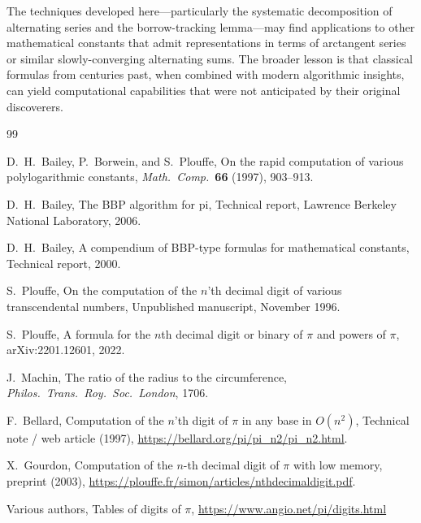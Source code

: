 \documentclass[11pt]{article}
\begin{document}
The techniques developed here---particularly the systematic decomposition of alternating series and the borrow-tracking lemma---may find applications to other mathematical constants that admit representations in terms of arctangent series or similar slowly-converging alternating sums. The broader lesson is that classical formulas from centuries past, when combined with modern algorithmic insights, can yield computational capabilities that were not anticipated by their original discoverers.

\begin{thebibliography}{99}

D.~H.~Bailey, P.~Borwein, and S.~Plouffe, On the rapid computation of various polylogarithmic constants, \emph{Math.\ Comp.}\ \textbf{66} (1997), 903--913.

D.~H.~Bailey, The BBP algorithm for pi, Technical report, Lawrence Berkeley National Laboratory, 2006.

D.~H.~Bailey, A compendium of BBP-type formulas for mathematical constants, Technical report, 2000.

S.~Plouffe, On the computation of the $n$'th decimal digit of various transcendental numbers, Unpublished manuscript, November 1996.

S.~Plouffe, A formula for the $n$th decimal digit or binary of $\pi$ and powers of $\pi$, arXiv:2201.12601, 2022.

J.~Machin, The ratio of the radius to the circumference, \emph{Philos.\ Trans.\ Roy.\ Soc.\ London}, 1706.

F.~Bellard, Computation of the $n$'th digit of $\pi$ in any base in $O(n^2)$, Technical note / web article (1997), \url{https://bellard.org/pi/pi_n2/pi_n2.html}.

X.~Gourdon, Computation of the $n$-th decimal digit of $\pi$ with low memory, preprint (2003), \url{https://plouffe.fr/simon/articles/nthdecimaldigit.pdf}.

Various authors, Tables of digits of $\pi$, \url{https://www.angio.net/pi/digits.html}

\end{thebibliography}
\end{document}
